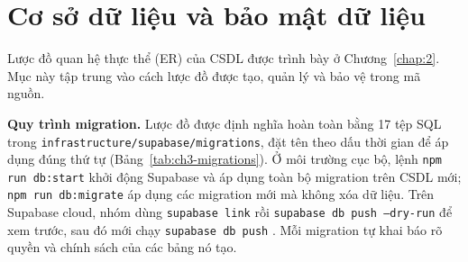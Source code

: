 \section{Cơ sở dữ liệu và bảo mật dữ liệu}
\label{sec:ch3-database}

Lược đồ quan hệ thực thể (ER) của CSDL được trình bày ở Chương~\ref{chap:2}. Mục này tập trung vào cách lược đồ được tạo, quản lý và bảo vệ trong mã nguồn.

\textbf{Quy trình migration.} Lược đồ được định nghĩa hoàn toàn bằng 17 tệp SQL trong \texttt{infrastructure/\allowbreak{}supabase/\allowbreak{}migrations}, đặt tên theo dấu thời gian để áp dụng đúng thứ tự (Bảng~\ref{tab:ch3-migrations}). Ở môi trường cục bộ, lệnh \texttt{npm run db:start} khởi động Supabase và áp dụng toàn bộ migration trên CSDL mới; \texttt{npm run db:migrate} áp dụng các migration mới mà không xóa dữ liệu. Trên Supabase cloud, nhóm dùng \texttt{supabase link} rồi \texttt{supabase db push --dry-\allowbreak{}run} để xem trước, sau đó mới chạy \texttt{supabase db push} \parencite{ch3-supabase-migrations}. Mỗi migration tự khai báo rõ quyền và chính sách của các bảng nó tạo.

